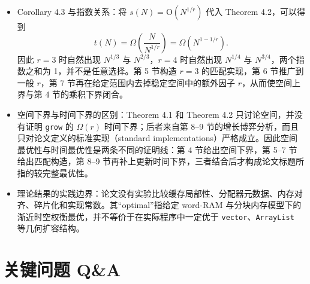 \documentclass[UTF8,11pt,a4paper]{ctexart}
\newcommand{\op}[1]{\textnormal{\texttt{#1}}}
\newcommand{\Oh}{\mathrm{O}}
\begin{document}
\begin{itemize}
  \item Corollary 4.3 与指数关系：将 $s(N)=\Oh(N^{1/r})$ 代入 Theorem 4.2，可以得到
  \[
    t(N)=\Omega\!\left(\frac{N}{N^{1/r}}\right)
        =\Omega\!\left(N^{1-1/r}\right).
  \]
  因此 $r=3$ 时自然出现 $N^{1/3}$ 与 $N^{2/3}$，$r=4$ 时自然出现 $N^{1/4}$ 与 $N^{3/4}$，两个指数之和为 1，并不是任意选择。第 5 节构造 $r=3$ 的匹配实现，第 6 节推广到一般 $r$，第 7 节再在给定范围内去掉稳定空间中的额外因子 $r$，从而使空间上界与第 4 节的乘积下界闭合。

  \item 空间下界与时间下界的区别：Theorem 4.1 和 Theorem 4.2 只讨论空间，并没有证明 \op{grow} 的 $\Omega(r)$ 时间下界；后者来自第 8--9 节的增长博弈分析，而且只对论文定义的标准实现（standard implementations）严格成立。因此空间最优性与时间最优性是两条不同的证明线：第 4 节给出空间下界，第 5--7 节给出匹配构造，第 8--9 节再补上更新时间下界，三者结合后才构成论文标题所指的较完整最优性。

  \item 理论结果的实践边界：论文没有实验比较缓存局部性、分配器元数据、内存对齐、碎片化和实现常数。其“optimal”指给定 word-RAM 与分块内存模型下的渐近时空权衡最优，并不等价于在实际程序中一定优于 \op{vector}、\op{ArrayList} 等几何扩容结构。

\end{itemize}

\section{关键问题 Q\&A}
\end{document}
